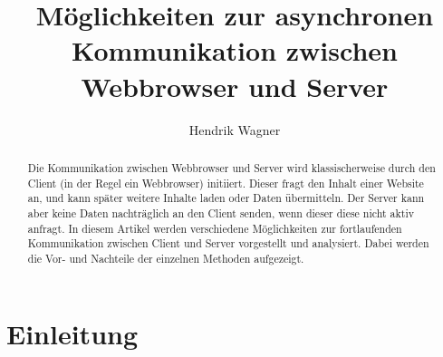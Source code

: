 \documentclass[sigplan, screen]{acmart}
\begin{document}
\title{Möglichkeiten zur asynchronen Kommunikation zwischen Webbrowser und Server}

\author{Hendrik Wagner}


\begin{abstract}
  Die Kommunikation zwischen Webbrowser und Server wird klassischerweise durch den Client (in der Regel ein Webbrowser) initiiert.
  Dieser fragt den Inhalt einer Website an, und kann später weitere Inhalte laden oder Daten übermitteln.
  Der Server kann aber keine Daten nachträglich an den Client senden, wenn dieser diese nicht aktiv anfragt.
  In diesem Artikel werden verschiedene Möglichkeiten zur fortlaufenden Kommunikation zwischen Client und Server vorgestellt und analysiert. 
  Dabei werden die Vor- und Nachteile der einzelnen Methoden aufgezeigt.
\end{abstract}


\maketitle
{}

\tableofcontents
\newpage



\section{Einleitung}
\end{document}
